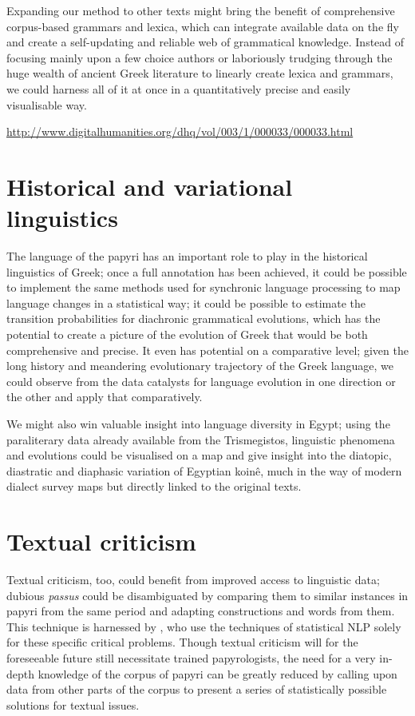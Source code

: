 Expanding our method to other texts might bring the benefit of comprehensive
corpus-based grammars and lexica, which can integrate available data on the fly
and create a self-updating and reliable web of grammatical knowledge. Instead
of focusing mainly upon a few choice authors or laboriously trudging through
the huge wealth of ancient Greek literature to linearly create lexica and
grammars, we could harness all of it at once in a quantitatively precise and
easily visualisable way.

\url{http://www.digitalhumanities.org/dhq/vol/003/1/000033/000033.html}


\section{Historical and variational linguistics} %
\label{sec:histlinguistics}

The language of the papyri has an important role to play in the historical
linguistics of Greek; once a full annotation has been achieved, it could be
possible to implement the same methods used for synchronic language processing
to map language changes in a statistical way; it could be possible to estimate
the transition probabilities for diachronic grammatical evolutions, which has
the potential to create a picture of the evolution of Greek that would be both
comprehensive and precise. It even has potential on a comparative level; given
the long history and meandering evolutionary trajectory of the Greek language,
we could observe from the data catalysts for language evolution in one
direction or the other and apply that comparatively.

We might also win valuable insight into language diversity in Egypt; using the
paraliterary data already available from the Trismegistos, linguistic phenomena
and evolutions could be visualised on a map and give insight into the diatopic,
diastratic and diaphasic variation of Egyptian koin\^e, much in the way of
modern dialect survey maps but directly linked to the original texts.


\section{Textual criticism} %
\label{sec:textualcriticism}

Textual criticism, too, could benefit from improved access to linguistic data;
dubious \textit{passus} could be disambiguated by comparing them to similar
instances in papyri from the same period and adapting constructions and words
from them.  This technique is harnessed by \citet{mimno2009}, who use the
techniques of statistical NLP solely for these specific critical problems.
Though textual criticism will for the foreseeable future still necessitate
trained papyrologists, the need for a very in-depth knowledge of the corpus of
papyri can be greatly reduced by calling upon data from other parts of the
corpus to present a series of statistically possible solutions for textual
issues.


